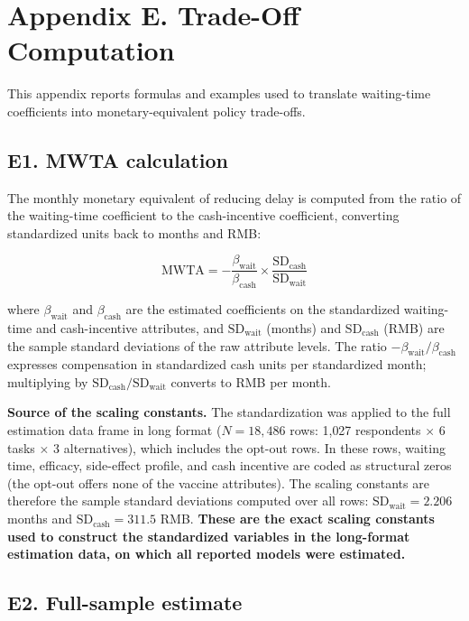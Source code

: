 \section*{Appendix E. Trade-Off Computation}
\label{app:E}

This appendix reports formulas and examples used to translate waiting-time coefficients into monetary-equivalent policy trade-offs.

\subsection*{E1. MWTA calculation}

The monthly monetary equivalent of reducing delay is computed from the ratio of the waiting-time coefficient to the cash-incentive coefficient, converting standardized units back to months and RMB:

\[
\text{MWTA} = -\frac{\beta_{\text{wait}}}{\beta_{\text{cash}}} \times \frac{\text{SD}_{\text{cash}}}{\text{SD}_{\text{wait}}}
\]

where $\beta_{\text{wait}}$ and $\beta_{\text{cash}}$ are the estimated coefficients on the standardized waiting-time and cash-incentive attributes, and $\text{SD}_{\text{wait}}$ (months) and $\text{SD}_{\text{cash}}$ (RMB) are the sample standard deviations of the raw attribute levels. The ratio $-\beta_{\text{wait}}/\beta_{\text{cash}}$ expresses compensation in standardized cash units per standardized month; multiplying by $\text{SD}_{\text{cash}}/\text{SD}_{\text{wait}}$ converts to RMB per month.

\noindent \textbf{Source of the scaling constants.} The standardization was applied to the full estimation data frame in long format ($N = 18{,}486$ rows: 1{,}027 respondents $\times$ 6 tasks $\times$ 3 alternatives), which includes the opt-out rows. In these rows, waiting time, efficacy, side-effect profile, and cash incentive are coded as structural zeros (the opt-out offers none of the vaccine attributes). The scaling constants are therefore the sample standard deviations computed over all rows: $\text{SD}_{\text{wait}} = 2.206$ months and $\text{SD}_{\text{cash}} = 311.5$ RMB. \textbf{These are the exact scaling constants used to construct the standardized variables in the long-format estimation data, on which all reported models were estimated.}

\subsection*{E2. Full-sample estimate}


